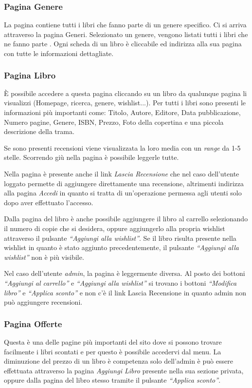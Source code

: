 \subsubsection{Pagina Genere}
La pagina contiene tutti i libri che fanno parte di un genere specifico. Ci si arriva attraverso la pagina Generi. Selezionato un genere, vengono listati tutti i libri che ne fanno parte . Ogni scheda di un libro è cliccabile ed indirizza alla sua pagina con tutte le informazioni dettagliate.

\subsubsection{Pagina Libro}
È possibile accedere a questa pagina cliccando su un libro da qualunque pagina li visualizzi (Homepage, ricerca, genere, wishlist...). Per tutti i libri sono presenti le informazioni più importanti come: Titolo, Autore, Editore, Data pubblicazione, Numero pagine, Genere, ISBN, Prezzo, Foto della copertina e una piccola descrizione della trama.

Se sono presenti recensioni viene visualizzata la loro media con un \textit{range} da 1-5 stelle. Scorrendo giù nella pagina è possibile leggerle tutte.

Nella pagina è presente anche il link \textit{Lascia Recensione} che nel caso dell’utente loggato permette di aggiungere direttamente una recensione, altrimenti indirizza alla pagina \textit{Accedi} in quanto si tratta di un’operazione permessa agli utenti solo dopo aver effettuato l’accesso.

Dalla pagina del libro è anche possibile aggiungere il libro al carrello selezionando il numero di copie che si desidera, oppure aggiungerlo alla propria wishlist attraverso il pulsante \textit{“Aggiungi alla wishlist”}. Se il libro risulta presente nella wishlist in quanto è stato aggiunto precedentemente, il pulsante \textit{“Aggiungi alla wishlist”} non è più visibile.

Nel caso dell'utente \textit{admin}, la pagina è leggermente diversa. Al posto dei bottoni \textit{“Aggiungi al carrello”} e \textit{“Aggiungi alla wishlist”} si trovano i bottoni \textit{“Modifica libro”} e \textit{“Applica sconto”} e non c’è il link Lascia Recensione in quanto admin non può aggiungere recensioni.

\subsubsection{Pagina Offerte}
Questa è una delle pagine più importanti del sito dove si possono trovare facilmente i libri scontati e per questo è possibile accedervi dal menu. La diminuzione del prezzo di un libro è competenza solo dell’admin è può essere effettuata attraverso la pagina \textit{Aggiungi Libro} presente nella sua sezione privata, oppure dalla pagina del libro stesso tramite il pulsante \textit{“Applica sconto”}.


